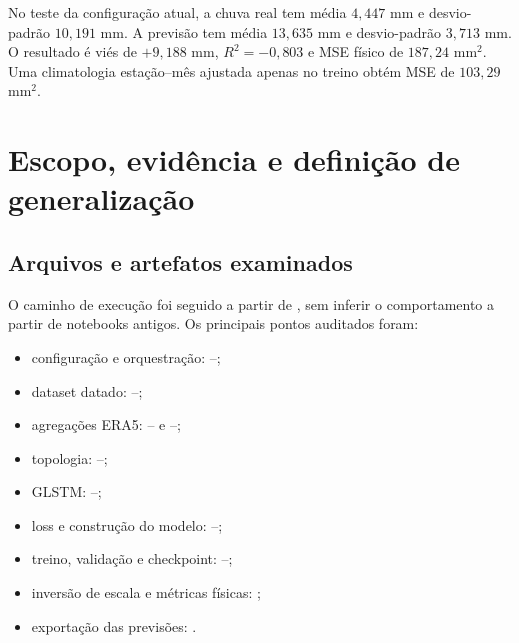 \documentclass[11pt,a4paper]{article}
\begin{document}
No teste da configuração atual, a chuva real tem média $4{,}447$ mm e desvio-padrão
$10{,}191$ mm. A previsão tem média $13{,}635$ mm e desvio-padrão $3{,}713$ mm. O resultado é
viés de $+9{,}188$ mm, $R^2=-0{,}803$ e MSE físico de $187{,}24$ mm$^2$. Uma climatologia
estação--mês ajustada apenas no treino obtém MSE de $103{,}29$ mm$^2$.

\section{Escopo, evidência e definição de generalização}

\subsection{Arquivos e artefatos examinados}

O caminho de execução foi seguido a partir de , sem inferir o
comportamento a partir de notebooks antigos. Os principais pontos auditados foram:

\begin{itemize}
  \item configuração e orquestração: --;
  \item dataset datado: --;
  \item agregações ERA5: --
  e --;
  \item topologia: --;
  \item GLSTM: --;
  \item loss e construção do modelo: --;
  \item treino, validação e checkpoint: --;
  \item inversão de escala e métricas físicas:
  ;
  \item exportação das previsões:
  .
\end{itemize}
\end{document}
